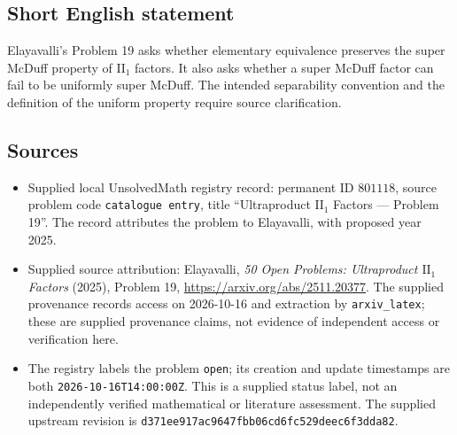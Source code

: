 \documentclass[11pt]{article}
\begin{document}
\subsection{Short English statement}
Elayavalli's Problem 19 asks whether elementary equivalence preserves the super McDuff property of \(\mathrm{II}_1\) factors. It also asks whether a super McDuff factor can fail to be uniformly super McDuff. The intended separability convention and the definition of the uniform property require source clarification.
\subsection{Sources}
\begin{itemize}
\item Supplied local UnsolvedMath registry record: permanent ID \(801118\), source problem code \texttt{catalogue entry}, title ``Ultraproduct \(\mathrm{II}_1\) Factors --- Problem 19''. The record attributes the problem to Elayavalli, with proposed year 2025.
\item Supplied source attribution: Elayavalli, \emph{50 Open Problems: Ultraproduct \(\mathrm{II}_1\) Factors} (2025), Problem 19, \url{https://arxiv.org/abs/2511.20377}. The supplied provenance records access on 2026-10-16 and extraction by \texttt{arxiv\_latex}; these are supplied provenance claims, not evidence of independent access or verification here.
\item The registry labels the problem \texttt{open}; its creation and update timestamps are both \texttt{2026-10-16T14:00:00Z}. This is a supplied status label, not an independently verified mathematical or literature assessment. The supplied upstream revision is \texttt{d371ee917ac9647fbb06cd6fc529deec6f3dda82}.
\end{itemize}
\end{document}
